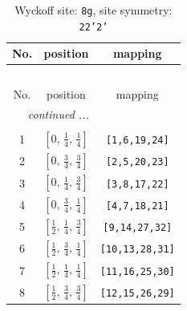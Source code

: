 \documentclass[fleqn,8pt]{jsarticle}
\begin{document}
\begin{longtable}{ccc}
\caption{Wyckoff site: {\tt 8g}, site symmetry: {\tt 22'2'}}
 \\
 \hline \hline
No. & position & mapping \\ \hline \endfirsthead

\multicolumn{2}{l}{\tablename\ \thetable{}} \\
 \hline \hline
No. & position & mapping \\ \hline \endhead

 \hline \hline
\multicolumn{2}{r}{\footnotesize\it continued ...} \\ \endfoot

 \hline \hline
\multicolumn{2}{r}{} \\ \endlastfoot

1 & $\left[ 0,\, \frac{1}{4},\, \frac{1}{4} \right]$ & {\tt [1,6,19,24]} \\ \hline
2 & $\left[ 0,\, \frac{3}{4},\, \frac{3}{4} \right]$ & {\tt [2,5,20,23]} \\ \hline
3 & $\left[ 0,\, \frac{1}{4},\, \frac{3}{4} \right]$ & {\tt [3,8,17,22]} \\ \hline
4 & $\left[ 0,\, \frac{3}{4},\, \frac{1}{4} \right]$ & {\tt [4,7,18,21]} \\ \hline
5 & $\left[ \frac{1}{2},\, \frac{1}{4},\, \frac{3}{4} \right]$ & {\tt [9,14,27,32]} \\ \hline
6 & $\left[ \frac{1}{2},\, \frac{3}{4},\, \frac{1}{4} \right]$ & {\tt [10,13,28,31]} \\ \hline
7 & $\left[ \frac{1}{2},\, \frac{1}{4},\, \frac{1}{4} \right]$ & {\tt [11,16,25,30]} \\ \hline
8 & $\left[ \frac{1}{2},\, \frac{3}{4},\, \frac{3}{4} \right]$ & {\tt [12,15,26,29]} \\
\end{longtable}
\renewcommand{\arraystretch}{1.2}
\end{document}

